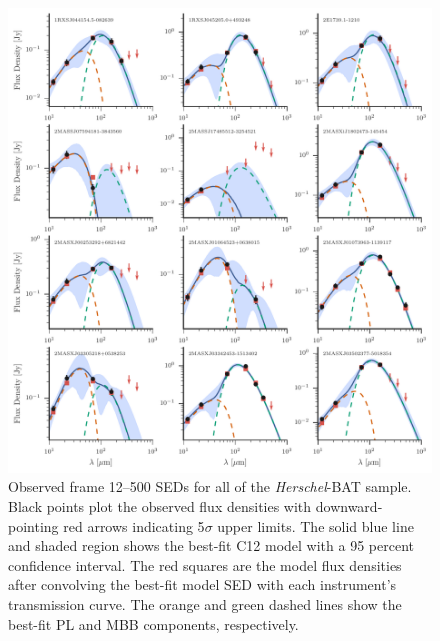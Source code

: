 \documentclass[fleqn, usenatbib]{mnras}
\newcommand{\herschel}{\emph{Herschel}}
\begin{document}
\begin{figure}
\centering
\includegraphics[width=\textwidth]{figures/sedfig1}
\caption{Observed frame 12--500 \micron{} SEDs for all of the \herschel-BAT sample. Black points plot the observed flux densities with downward-pointing red arrows indicating 5$\sigma$ upper limits. The solid blue line and shaded region shows the best-fit C12 model with a 95 percent confidence interval. The red squares are the model flux densities after convolving the best-fit model SED with each instrument's transmission curve. The orange and green dashed lines show the best-fit PL and MBB components, respectively. \label{fig:seds}}
\end{figure}
%
\end{document}
